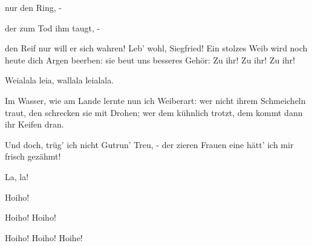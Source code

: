 \begin{drama}
\Flosshildespeaks

nur den Ring, -
 

\Wellgundespeaks

der zum Tod ihm taugt, -
 

den Reif nur will er sich wahren!
Leb' wohl, Siegfried!
Ein stolzes Weib
wird noch heute dich Argen beerben:
sie beut uns besseres Gehör:
Zu ihr! Zu ihr! Zu ihr!
 






Weialala leia, wallala leialala.
 

\Siegfriedspeaks

Im Wasser, wie am Lande
lernte nun ich Weiberart:
wer nicht ihrem Schmeicheln traut,
den schrecken sie mit Drohen;
wer dem kühnlich trotzt,
dem kommt dann ihr Keifen dran.


Und doch, trüg' ich nicht Gutrun' Treu, -
der zieren Frauen eine
hätt' ich mir frisch gezähmt!





La, la!







Hoiho!
 



\scene



Hoiho! Hoiho!
 

\Siegfriedspeaks



Hoiho! Hoiho! Hoihe!
 


\end{drama}
